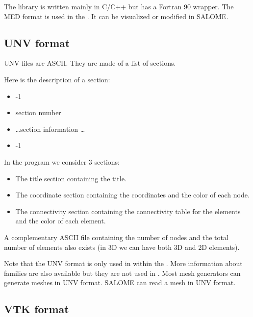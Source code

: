 The library is written mainly in C/C++ but has a Fortran 90 wrapper.
The MED format is used in the \telemacsystem. It can be visualized or modified in SALOME.

\subsection{UNV format}

UNV files are ASCII. They are made of a list of sections.

Here is the description of a section:

\begin{itemize}
\setlength{\itemsep}{1pt}
\setlength{\parskip}{0pt}
\setlength{\parsep}{0pt}
\item -1
\item section number
\item \ldots section information \ldots
\item -1
\end{itemize}
In the program we consider 3 sections:
\begin{itemize}
\setlength{\itemsep}{1pt}
\setlength{\parskip}{0pt}
\setlength{\parsep}{0pt}
\item The title section containing the title.
\item The coordinate section containing the coordinates and the color of each
node.
\item The connectivity section containing the connectivity table for the
elements and the color of each element.
\end{itemize}

A complementary ASCII file containing the number of nodes and the total number
of elements also exists (in 3D we can have both 3D and 2D elements).

Note that the UNV format is only used in \estel within the \telemacsystem.
More information about families are also available but they are not used in
\estel.
Most mesh generators can generate meshes in UNV format.
SALOME can read a mesh in UNV format.

\subsection{VTK format}

